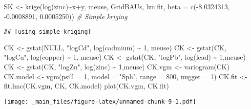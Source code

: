 \documentclass[
]{book}
\newenvironment{Shaded}{\begin{snugshade}}{\end{snugshade}}
\newcommand{\AttributeTok}[1]{\textcolor[rgb]{0.77,0.63,0.00}{#1}}
\newcommand{\CommentTok}[1]{\textcolor[rgb]{0.56,0.35,0.01}{\textit{#1}}}
\newcommand{\ConstantTok}[1]{\textcolor[rgb]{0.00,0.00,0.00}{#1}}
\newcommand{\DecValTok}[1]{\textcolor[rgb]{0.00,0.00,0.81}{#1}}
\newcommand{\FloatTok}[1]{\textcolor[rgb]{0.00,0.00,0.81}{#1}}
\newcommand{\FunctionTok}[1]{\textcolor[rgb]{0.00,0.00,0.00}{#1}}
\newcommand{\NormalTok}[1]{#1}
\newcommand{\OtherTok}[1]{\textcolor[rgb]{0.56,0.35,0.01}{#1}}
\newcommand{\SpecialCharTok}[1]{\textcolor[rgb]{0.00,0.00,0.00}{#1}}
\newcommand{\StringTok}[1]{\textcolor[rgb]{0.31,0.60,0.02}{#1}}
\begin{document}
\begin{Shaded}
\begin{Highlighting}[]
\NormalTok{SK }\OtherTok{\textless{}{-}} \FunctionTok{krige}\NormalTok{(}\FunctionTok{log}\NormalTok{(zinc)}\SpecialCharTok{\textasciitilde{}}\NormalTok{x}\SpecialCharTok{+}\NormalTok{y, meuse, GridBAUs, lzn.fit, }
            \AttributeTok{beta =} \FunctionTok{c}\NormalTok{(}\SpecialCharTok{{-}}\FloatTok{8.0324313}\NormalTok{, }\SpecialCharTok{{-}}\FloatTok{0.0008891}\NormalTok{, }\FloatTok{0.0005250}\NormalTok{)) }\CommentTok{\# Simple kriging}
\end{Highlighting}
\end{Shaded}

\begin{verbatim}
## [using simple kriging]
\end{verbatim}

\begin{Shaded}
\begin{Highlighting}[]
\NormalTok{CK }\OtherTok{\textless{}{-}} \FunctionTok{gstat}\NormalTok{(}\ConstantTok{NULL}\NormalTok{, }\StringTok{"logCd"}\NormalTok{, }\FunctionTok{log}\NormalTok{(cadmium) }\SpecialCharTok{\textasciitilde{}} \DecValTok{1}\NormalTok{, meuse)}
\NormalTok{CK }\OtherTok{\textless{}{-}} \FunctionTok{gstat}\NormalTok{(CK, }\StringTok{"logCu"}\NormalTok{, }\FunctionTok{log}\NormalTok{(copper) }\SpecialCharTok{\textasciitilde{}} \DecValTok{1}\NormalTok{, meuse)}
\NormalTok{CK }\OtherTok{\textless{}{-}} \FunctionTok{gstat}\NormalTok{(CK, }\StringTok{"logPb"}\NormalTok{, }\FunctionTok{log}\NormalTok{(lead) }\SpecialCharTok{\textasciitilde{}} \DecValTok{1}\NormalTok{,meuse)}
\NormalTok{CK }\OtherTok{\textless{}{-}} \FunctionTok{gstat}\NormalTok{(CK, }\StringTok{"logZn"}\NormalTok{, }\FunctionTok{log}\NormalTok{(zinc) }\SpecialCharTok{\textasciitilde{}} \DecValTok{1}\NormalTok{,meuse)}
\NormalTok{CK.vgm }\OtherTok{\textless{}{-}} \FunctionTok{variogram}\NormalTok{(CK)}
\NormalTok{CK.model }\OtherTok{\textless{}{-}} \FunctionTok{vgm}\NormalTok{(}\AttributeTok{psill =} \DecValTok{1}\NormalTok{, }\AttributeTok{model =} \StringTok{"Sph"}\NormalTok{,}
           \AttributeTok{range =} \DecValTok{800}\NormalTok{, }\AttributeTok{nugget =} \DecValTok{1}\NormalTok{)}
\NormalTok{CK.fit }\OtherTok{\textless{}{-}} \FunctionTok{fit.lmc}\NormalTok{(CK.vgm, CK, CK.model)}
\FunctionTok{plot}\NormalTok{(CK.vgm, CK.fit)}
\end{Highlighting}
\end{Shaded}

\texttt{[image: \_main\_files/figure-latex/unnamed-chunk-9-1.pdf]}
\end{document}
